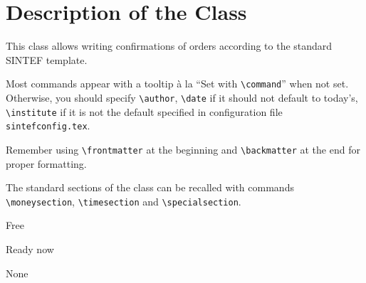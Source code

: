 \documentclass{sintefconfirmation}
\author{Federico Zenith}
\begin{document}
\frontmatter

\section*{Description of the Class}
This class allows writing confirmations of orders according to the standard
SINTEF template.

Most commands appear with a tooltip à la ``Set with \verb|\command|'' when not
set.
Otherwise, you should specify \verb|\author|, \verb|\date| if it should not
default to today's, \verb|\institute| if it is not the default specified in
configuration file \texttt{sintefconfig.tex}.

Remember using \verb|\frontmatter| at the beginning and \verb|\backmatter| at
the end for proper formatting.

The standard sections of the class can be recalled with commands
\verb|\moneysection|, \verb|\timesection| and \verb|\specialsection|.

\moneysection
Free

\timesection
Ready now

\specialsection
None

\backmatter
\end{document}
